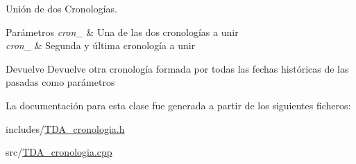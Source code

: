 Unión de dos Cronologías. 


\begin{DoxyParams}{Parámetros}
{\em cron\+\_} & Una de las dos cronologías a unir \\
\hline
{\em cron\+\_} & Segunda y última cronología a unir \\
\hline
\end{DoxyParams}
\begin{DoxyReturn}{Devuelve}
Devuelve otra cronología formada por todas las fechas históricas de las pasadas como parámetros 
\end{DoxyReturn}


La documentación para esta clase fue generada a partir de los siguientes ficheros\+:\begin{DoxyCompactItemize}
\item 
includes/\hyperlink{TDA__cronologia_8h}{T\+D\+A\+\_\+cronologia.\+h}\item 
src/\hyperlink{TDA__cronologia_8cpp}{T\+D\+A\+\_\+cronologia.\+cpp}\end{DoxyCompactItemize}

